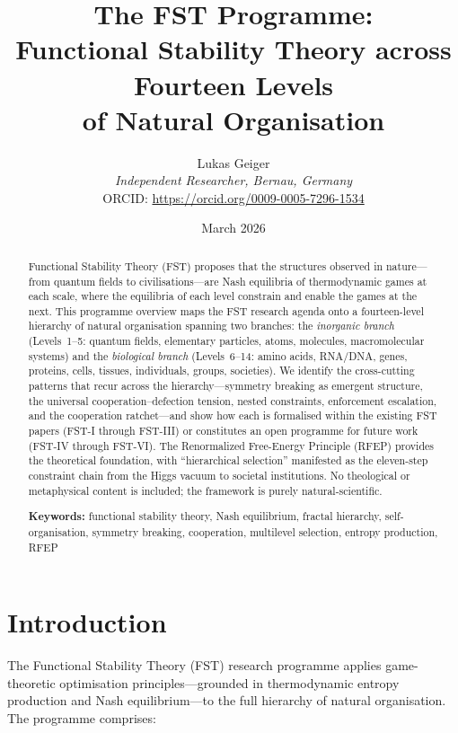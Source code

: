 \documentclass[12pt,a4paper]{article}
\title{The FST Programme:\\
Functional Stability Theory across Fourteen Levels\\
of Natural Organisation}
\author{Lukas Geiger\\
\textit{Independent Researcher, Bernau, Germany}\\
ORCID: \url{https://orcid.org/0009-0005-7296-1534}}
\date{March 2026}
\theoremstyle{remark}
\begin{document}
\maketitle

\begin{abstract}
\noindent
Functional Stability Theory (FST) proposes that the structures observed in nature---from quantum fields to civilisations---are Nash equilibria of thermodynamic games at each scale, where the equilibria of each level constrain and enable the games at the next.
This programme overview maps the FST research agenda onto a fourteen-level hierarchy of natural organisation spanning two branches: the \emph{inorganic branch} (Levels~1--5: quantum fields, elementary particles, atoms, molecules, macromolecular systems) and the \emph{biological branch} (Levels~6--14: amino acids, RNA/DNA, genes, proteins, cells, tissues, individuals, groups, societies).
We identify the cross-cutting patterns that recur across the hierarchy---symmetry breaking as emergent structure, the universal cooperation--defection tension, nested constraints, enforcement escalation, and the cooperation ratchet---and show how each is formalised within the existing FST papers (FST-I through FST-III) or constitutes an open programme for future work (FST-IV through FST-VI).
The Renormalized Free-Energy Principle (RFEP) provides the theoretical foundation, with ``hierarchical selection'' manifested as the eleven-step constraint chain from the Higgs vacuum to societal institutions.
No theological or metaphysical content is included; the framework is purely natural-scientific.

\medskip
\noindent\textbf{Keywords:} functional stability theory, Nash equilibrium, fractal hierarchy, self-organisation, symmetry breaking, cooperation, multilevel selection, entropy production, RFEP
\end{abstract}

\newpage
\setcounter{page}{1}

\section{Introduction}
\label{sec:introduction}

The Functional Stability Theory (FST) research programme applies game-theoretic optimisation principles---grounded in thermodynamic entropy production and Nash equilibrium---to the full hierarchy of natural organisation. The programme comprises:
\end{document}

